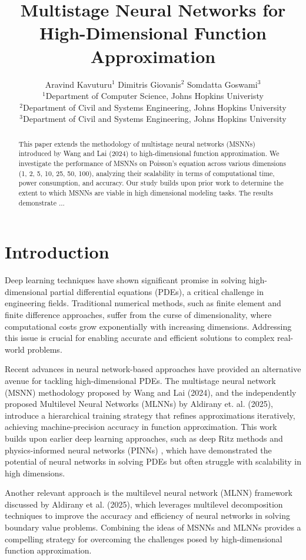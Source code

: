 \documentclass[a4paper,12pt]{article}
\title{\LARGE \textbf{Multistage Neural Networks for High-Dimensional Function Approximation} \\[1ex]}
\author{
    Aravind Kavuturu$^{1}$ \quad Dimitris Giovanis$^{2}$ \quad Somdatta Goswami$^{3}$ \\[1ex]
    \small $^{1}$Department of Computer Science, Johns Hopkins Univeristy \\
    \small $^{2}$Department of Civil and Systems Engineering, Johns Hopkins University \\
    \small $^{3}$Department of Civil and Systems Engineering, Johns Hopkins University
}
\date{}
\begin{document}
\maketitle


\begin{abstract}
    This paper extends the methodology of multistage neural networks (MSNNs) introduced by Wang and Lai (2024) to high-dimensional function approximation. We investigate the performance of MSNNs on Poisson's equation across various dimensions (1, 2, 5, 10, 25, 50, 100), analyzing their scalability in terms of computational time, power consumption, and accuracy. Our study builds upon prior work to determine the extent to which MSNNs are
    viable in high dimensional modeling tasks. The results demonstrate ...
\end{abstract}

\section{Introduction}
Deep learning techniques have shown significant promise in solving high-dimensional partial differential equations (PDEs), a critical challenge in engineering fields. Traditional numerical methods, such as finite element and finite difference approaches, suffer from the curse of dimensionality, where computational costs grow exponentially with increasing dimensions. Addressing this issue is crucial for enabling accurate and efficient solutions to complex real-world problems.

Recent advances in neural network-based approaches have provided an alternative avenue for tackling high-dimensional PDEs. The multistage neural network (MSNN) methodology proposed by Wang and Lai (2024), and the independently proposed Multilevel Neural Networks (MLNNs) by Aldirany et. al. (2025), introduce a hierarchical training strategy that refines approximations iteratively, achieving machine-precision accuracy in function approximation. This work builds upon earlier deep learning approaches, such as deep Ritz methods \cite{weinan2018deep} and physics-informed neural networks (PINNs) \cite{raissi2019physics}, which have demonstrated the potential of neural networks in solving PDEs but often struggle with scalability in high dimensions.

Another relevant approach is the multilevel neural network (MLNN) framework discussed by Aldirany et al. (2025), which leverages multilevel decomposition techniques to improve the accuracy and efficiency of neural networks in solving boundary value problems. Combining the ideas of MSNNs and MLNNs provides a compelling strategy for overcoming the challenges posed by high-dimensional function approximation.
\end{document}
